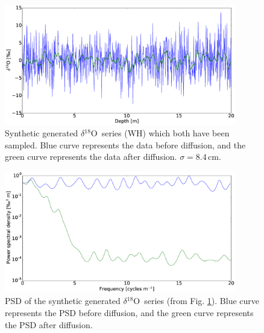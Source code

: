 \documentclass[11pt, draftcls, onecolumn]{IEEEtran} %
\numberwithin{equation}{section}
\numberwithin{table}{section}
\numberwithin{figure}{section}
\newcommand{\delOx}{$\delta{}^{18}\mathrm{O}$}
\begin{document}
\begin{appendices}
\begin{figure}[]
	\vspace*{2mm}
	\begin{center}
		\includegraphics[width=0.9\textwidth]{Figure_14}
		\caption{Synthetic generated \delOx~series (WH) which both have been sampled. Blue curve represents the data before
			diffusion, and the green curve represents the data after diffusion. $\sigma=8.4\,\mathrm{cm}$.}  \label{fig:appendix_synthetic_data}
	\end{center}
\end{figure}

\begin{figure}[]
	\vspace*{2mm}
	\begin{center}
		\includegraphics[width=0.9\textwidth]{Figure_15}
		\caption{PSD of the synthetic generated \delOx~series (from Fig. \ref{fig:appendix_synthetic_data}). Blue curve represents the PSD before
			diffusion, and the green curve represents the PSD after diffusion. }  \label{fig:appendix_synthetic_PSD}
	\end{center}
\end{figure}



\end{appendices}
\end{document}
